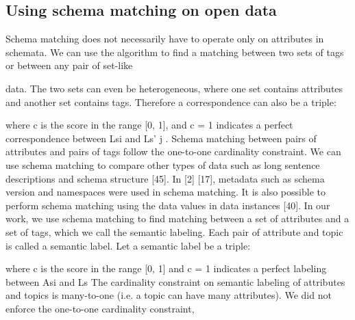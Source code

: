 \subsection{Using schema matching on open data}
\label{ssec:UsingSchemaMatchingOnOpenData}

Schema matching does not necessarily have to operate only on attributes in schemata. We can use the algorithm to find a matching between two sets of tags or between any pair of set-like

data. The two sets can even be heterogeneous, where one set contains attributes and another set contains tags.
Therefore a correspondence can also be a triple:

where c is the score in the range [0, 1], and c = 1 indicates a perfect correspondence between Lsi and Ls' j . Schema matching between pairs of attributes and pairs of tags follow the one-to-one cardinality constraint.
We can use schema matching to compare other types of data such as long sentence descriptions and schema structure \cite{Sorrentino2011NORMS}[45]. In \cite{10.1145/1066157.1066283}[2] \cite{Duchateau2009YAM}[17], metadata such as schema version and namespaces were used in schema matching. It is also possible to perform schema matching using the data values in data instances \cite{Rahm2001Survey}[40]. In our work, we use schema matching to find matching between a set of attributes and a set of tags, which we call the semantic labeling. Each pair of attribute and topic is called a semantic label.
Let a semantic label be a triple:

where c is the score in the range [0, 1] and c = 1 indicates a perfect labeling between Asi and Ls
The cardinality constraint on semantic labeling of attributes and topics is many-to-one (i.e. a topic can have many attributes). We did not enforce the one-to-one cardinality constraint,

